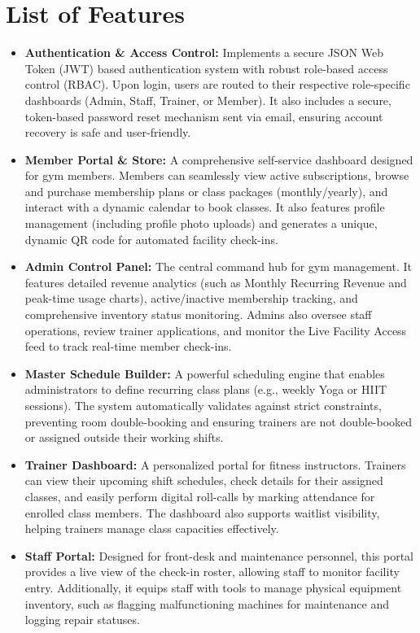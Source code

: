 \documentclass[12pt,a4paper]{article}
\begin{document}
\newpage
\section{List of Features}
\begin{itemize}[leftmargin=*]
    \item \textbf{Authentication \& Access Control:} Implements a secure JSON Web Token (JWT) based authentication system with robust role-based access control (RBAC). Upon login, users are routed to their respective role-specific dashboards (Admin, Staff, Trainer, or Member). It also includes a secure, token-based password reset mechanism sent via email, ensuring account recovery is safe and user-friendly.
    \item \textbf{Member Portal \& Store:} A comprehensive self-service dashboard designed for gym members. Members can seamlessly view active subscriptions, browse and purchase membership plans or class packages (monthly/yearly), and interact with a dynamic calendar to book classes. It also features profile management (including profile photo uploads) and generates a unique, dynamic QR code for automated facility check-ins.
    \item \textbf{Admin Control Panel:} The central command hub for gym management. It features detailed revenue analytics (such as Monthly Recurring Revenue and peak-time usage charts), active/inactive membership tracking, and comprehensive inventory status monitoring. Admins also oversee staff operations, review trainer applications, and monitor the Live Facility Access feed to track real-time member check-ins.
    \item \textbf{Master Schedule Builder:} A powerful scheduling engine that enables administrators to define recurring class plans (e.g., weekly Yoga or HIIT sessions). The system automatically validates against strict constraints, preventing room double-booking and ensuring trainers are not double-booked or assigned outside their working shifts.
    \item \textbf{Trainer Dashboard:} A personalized portal for fitness instructors. Trainers can view their upcoming shift schedules, check details for their assigned classes, and easily perform digital roll-calls by marking attendance for enrolled class members. The dashboard also supports waitlist visibility, helping trainers manage class capacities effectively.
    \item \textbf{Staff Portal:} Designed for front-desk and maintenance personnel, this portal provides a live view of the check-in roster, allowing staff to monitor facility entry. Additionally, it equips staff with tools to manage physical equipment inventory, such as flagging malfunctioning machines for maintenance and logging repair statuses.

\end{itemize}
\end{document}
